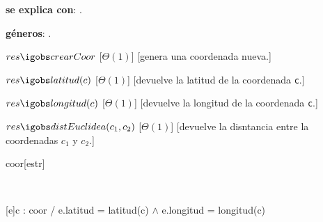 \begin{Interfaz}


  \textbf{se explica con}: .

  \textbf{g\'eneros}: .



  {$res \igobs crearCoor$}%
  [$\Theta(1)$]
  [genera una coordenada nueva.]


  {$res \igobs latitud(c)$}
  [$\Theta(1)$]
  [devuelve la latitud de la coordenada \texttt{c}.]

  {$res \igobs longitud(c)$}
  [$\Theta(1)$]
  [devuelve la longitud de la coordenada \texttt{c}.]


  {$res \igobs distEuclidea(c_1, c_2)$}%
  [$\Theta(1)$]
  [devuelve la disntancia entre la coordenadas \texttt{$c_1$} y \texttt{$c_2$}.]


\end{Interfaz}

\begin{Representacion}
 
  \begin{Estructura}{coor}[estr]
      \begin{Tupla}[estr]%
    \end{Tupla}
  \end{Estructura}


  ~

  [e]{c : coor / e.latitud = latitud(c) $\land$ e.longitud = longitud(c)}

\end{Representacion}

